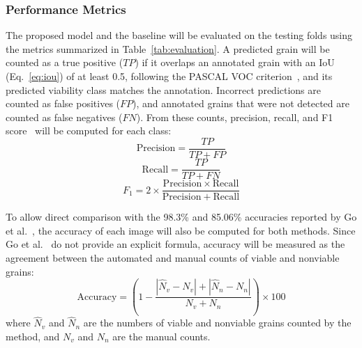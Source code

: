 \subsubsection{Performance Metrics}
\label{sec:m-metrics}

The proposed model and the baseline will be evaluated on the testing folds using the metrics summarized in Table~\ref{tab:evaluation}. A predicted grain will be counted as a true positive ($TP$) if it overlaps an annotated grain with an IoU (Eq.~\eqref{eq:iou}) of at least 0.5, following the PASCAL VOC criterion~\cite{everingham2010pascal}, and its predicted viability class matches the annotation. Incorrect predictions are counted as false positives ($FP$), and annotated grains that were not detected are counted as false negatives ($FN$). From these counts, precision, recall, and F1 score~\cite{sokolova2009} will be computed for each class:
\begin{equation}
    \mathrm{Precision} = \frac{TP}{TP + FP}
    \label{eq:precision}
\end{equation}
\begin{equation}
    \mathrm{Recall} = \frac{TP}{TP + FN}
    \label{eq:recall}
\end{equation}
\begin{equation}
    F_1 = 2 \times \frac{\mathrm{Precision} \times \mathrm{Recall}}{\mathrm{Precision} + \mathrm{Recall}}
    \label{eq:f1}
\end{equation}

To allow direct comparison with the 98.3\% and 85.06\% accuracies reported by Go et al.~\cite{go2019}, the accuracy of each image will also be computed for both methods. Since Go et al.~\cite{go2019} do not provide an explicit formula, accuracy will be measured as the agreement between the automated and manual counts of viable and nonviable grains:
\begin{equation}
    \mathrm{Accuracy} = \left(1 - \frac{|\hat{N}_v - N_v| + |\hat{N}_n - N_n|}{N_v + N_n}\right) \times 100
    \label{eq:accuracy}
\end{equation}
where $\hat{N}_v$ and $\hat{N}_n$ are the numbers of viable and nonviable grains counted by the method, and $N_v$ and $N_n$ are the manual counts.


